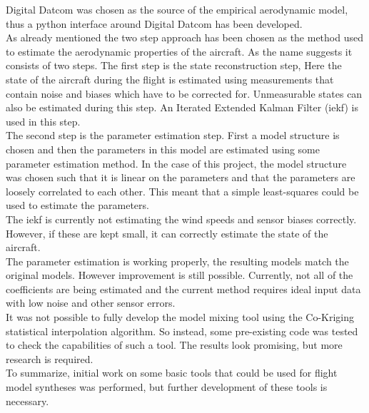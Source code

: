 Digital Datcom was chosen as the source of the empirical aerodynamic model, thus a python interface around Digital Datcom has been developed. \\

As already mentioned the two step approach has been chosen as the method used to estimate the aerodynamic properties of the aircraft. As the name suggests it consists of two steps. The first step is the state reconstruction step, Here the state of the aircraft during the flight is estimated using measurements that contain noise and biases which have to be corrected for. Unmeasurable states can also be estimated during this step. An Iterated Extended Kalman Filter (\gls{iekf}) is used in this step.\\

The second step is the parameter estimation step. First a model structure is chosen and then the parameters in this model are estimated using some parameter estimation method. In the case of this project, the model structure was chosen such that it is linear on the parameters and that the parameters are loosely correlated to each other. This meant that a simple least-squares could be used to estimate the parameters. \\

The \gls{iekf} is currently not estimating the wind speeds and sensor biases correctly. However, if these are kept small, it can correctly estimate the state of the aircraft.\\

The parameter estimation is working properly, the resulting models match the original models. However improvement is still possible. Currently, not all of the coefficients are being estimated and the current method requires ideal input data with low noise and other sensor errors. \\

It was not possible to fully develop the model mixing tool using the Co-Kriging statistical interpolation algorithm. So instead, some pre-existing code was tested to check the capabilities of such a tool. The results look promising, but more research is required.\\

To summarize, initial work on some basic tools that could be used for flight model syntheses was performed, but further development of these tools is necessary.
